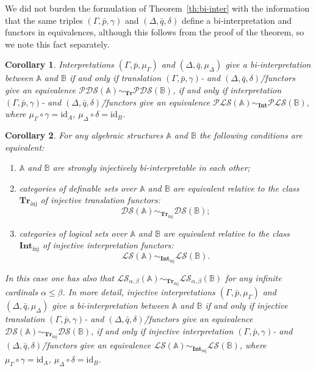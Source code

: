\documentclass[12pt]{article}
\newtheorem{corollary}{Corollary}
\theoremstyle{definition}
\def\MA{{\mathbb{A}}}
\def\MB{{\mathbb{B}}}
\def\Int{{\mathbf{Int}}}
\def\Tr{{\mathbf{Tr}}}
\newcommand{\Inj}{\mathrm{inj}}
\def\PLS{{\mathcal{PLS}}}
\def\PDS{{\mathcal{PDS}}}
\def\DS{{\mathcal{DS}}}
\def\LS{{\mathcal{LS}}}
\def\id{{\mathrm{id}}}
\begin{document}
We did not burden the formulation of Theorem~\ref{th:bi-inter} with the information that the same triples $(\Gamma,\bar p,\gamma)$ and $(\Delta,\bar q,\delta)$ define a bi-interpretation and functors in equivalences, although this follows from the proof of the theorem, so we note this fact separately.

\begin{corollary}\label{cor:bi0}
Interpretations $(\Gamma,\bar p,\mu_\Gamma)$ and $(\Delta,\bar q,\mu_\Delta)$ give a bi-interpretation between $\MA$ and $\MB$ if and only if translation $(\Gamma,\bar p,\gamma)$- and $(\Delta,\bar q,\delta)$\=/functors give an equivalence $\PDS(\MA)\sim_\Tr\PDS(\MB)$, if and only if interpretation $(\Gamma,\bar p,\gamma)$- and $(\Delta,\bar q,\delta)$\=/functors give an equivalence $\PLS(\MA)\sim_\Int\PLS(\MB)$, where $\mu_\Gamma\circ\gamma=\id_A$, $\mu_\Delta\circ\delta=\id_B$.    
\end{corollary}

\begin{corollary}\label{cor:bi1}
For any algebraic structures $\MA$ and $\MB$ the following conditions are equivalent:
\begin{enumerate}[label=(\arabic*)]
    \item $\MA$ and $\MB$ are strongly injectively bi-interpretable in each other;
    \item categories of definable sets over $\MA$ and $\MB$ are equivalent relative to the class $\Tr_\Inj$ of injective translation functors:    $$\DS(\MA)\sim_{\Tr_\Inj}\DS(\MB);$$
    \item categories of logical sets over $\MA$ and $\MB$ are equivalent relative to the class $\Int_\Inj$ of injective interpretation functors:    $$\LS(\MA)\sim_{\Int_\Inj}\LS(\MB).$$
\end{enumerate}
In this case one has also that $\LS_{\alpha,\beta}(\MA)\sim_{\Tr_\Inj}\LS_{\alpha,\beta}(\MB)$ for any infinite cardinals $\alpha\leqslant\beta$. In more detail, injective interpretations $(\Gamma,\bar p,\mu_\Gamma)$ and $(\Delta,\bar q,\mu_\Delta)$ give a bi-interpretation between $\MA$ and $\MB$ if and only if injective translation $(\Gamma,\bar p,\gamma)$- and $(\Delta,\bar q,\delta)$\=/functors give an equivalence $\DS(\MA)\sim_{\Tr_\Inj}\DS(\MB)$, if and only if injective interpretation $(\Gamma,\bar p,\gamma)$- and $(\Delta,\bar q,\delta)$\=/functors give an equivalence $\LS(\MA)\sim_{\Int_\Inj}\LS(\MB)$, where $\mu_\Gamma\circ\gamma=\id_A$, $\mu_\Delta\circ\delta=\id_B$.
\end{corollary}
\end{document}
